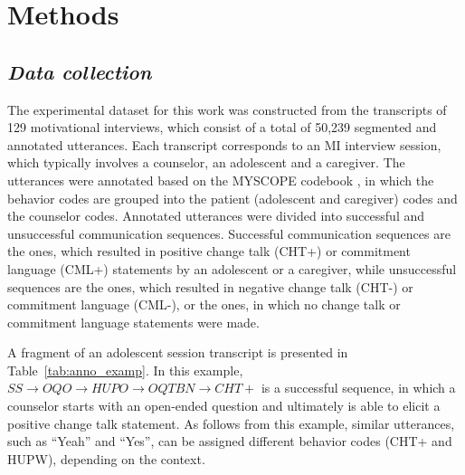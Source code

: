 \documentclass{amia_summit_2018}
\begin{document}
\section*{Methods}
\subsection*{\textit{Data collection}}

The experimental dataset for this work was constructed from the transcripts of 129 motivational interviews, which consist of a total of 50,239 segmented and annotated utterances. Each transcript corresponds to an MI interview session, which typically involves a counselor, an adolescent and a caregiver. The utterances were annotated based on the MYSCOPE codebook \cite{carcone2013provider}, in which the behavior codes are grouped into the patient (adolescent and caregiver) codes and the counselor codes. Annotated utterances were divided into successful and unsuccessful communication sequences. Successful communication sequences are the ones, which resulted in positive change talk (CHT+) or commitment language (CML+) statements by an adolescent or a caregiver, while unsuccessful sequences are the ones, which resulted in negative change talk (CHT-) or commitment language (CML-), or the ones, in which no change talk or commitment language statements were made. 

A fragment of an adolescent session transcript is presented in Table~\ref{tab:anno_examp}. In this example, $SS\rightarrow OQO\rightarrow HUPO\rightarrow OQTBN\rightarrow CHT+$ is a successful sequence, in which a counselor starts with an open-ended question and ultimately is able to elicit a positive change talk statement. As follows from this example, similar utterances, such as ``Yeah'' and ``Yes'', can be assigned different behavior codes (CHT+ and HUPW), depending on the context.\\
\end{document}
